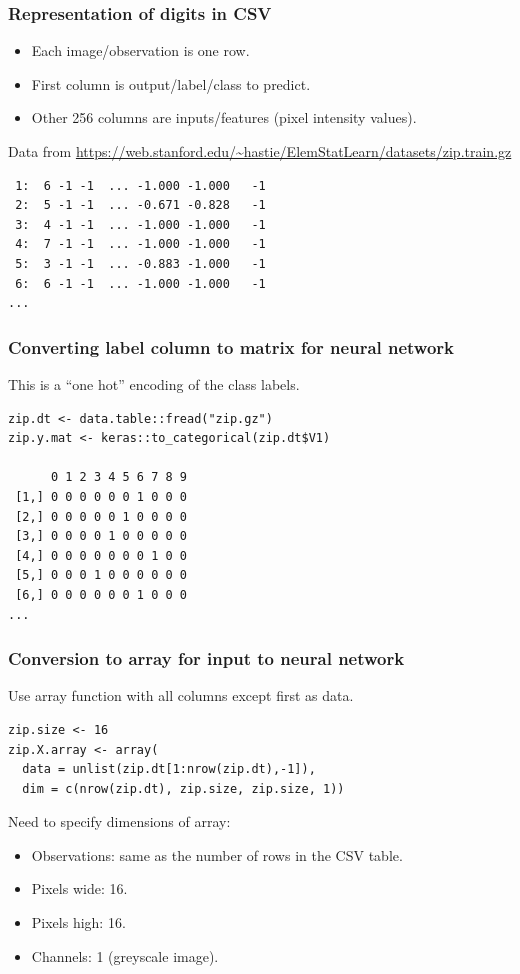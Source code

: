 \documentclass{beamer}
\begin{document}
\begin{frame}[fragile]
  \frametitle{Representation of digits in CSV}

  \begin{itemize}
  \item Each image/observation is one row.
  \item First column is output/label/class to predict.
  \item Other 256 columns are inputs/features (pixel intensity
    values).
  \end{itemize}
 Data from {\scriptsize \url{https://web.stanford.edu/~hastie/ElemStatLearn/datasets/zip.train.gz}}

\begin{verbatim}
 1:  6 -1 -1  ... -1.000 -1.000   -1
 2:  5 -1 -1  ... -0.671 -0.828   -1
 3:  4 -1 -1  ... -1.000 -1.000   -1
 4:  7 -1 -1  ... -1.000 -1.000   -1
 5:  3 -1 -1  ... -0.883 -1.000   -1
 6:  6 -1 -1  ... -1.000 -1.000   -1
...
\end{verbatim}
  
\end{frame}

\begin{frame}[fragile]
  \frametitle{Converting label column to matrix for neural network}

  This is a ``one hot'' encoding of the class labels.  
  
\begin{verbatim}
zip.dt <- data.table::fread("zip.gz")
zip.y.mat <- keras::to_categorical(zip.dt$V1)

      0 1 2 3 4 5 6 7 8 9
 [1,] 0 0 0 0 0 0 1 0 0 0
 [2,] 0 0 0 0 0 1 0 0 0 0
 [3,] 0 0 0 0 1 0 0 0 0 0
 [4,] 0 0 0 0 0 0 0 1 0 0
 [5,] 0 0 0 1 0 0 0 0 0 0
 [6,] 0 0 0 0 0 0 1 0 0 0
...
\end{verbatim}


\end{frame}

\begin{frame}[fragile]
  \frametitle{Conversion to array for input to neural network}
Use array function with all columns except first as data.  
\begin{verbatim}
zip.size <- 16
zip.X.array <- array(
  data = unlist(zip.dt[1:nrow(zip.dt),-1]),
  dim = c(nrow(zip.dt), zip.size, zip.size, 1))
\end{verbatim}
Need to specify dimensions of array:
\begin{itemize}
\item Observations: same as the number of rows in the CSV table.
\item Pixels wide: 16.
\item Pixels high: 16.
\item Channels: 1 (greyscale image).
\end{itemize}

\end{frame}
\end{document}
